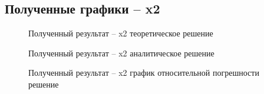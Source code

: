 \documentclass[12pt]{article}
\begin{document}
		\subsection{Полученные графики -- x2}
		
\begin{figure}[h]
	\caption{Полученный результат -- x2 теоретическое решение}
\end{figure}

\begin{figure}[h]
	\caption{Полученный результат -- x2 аналитическое решение}
\end{figure}

\begin{figure}[h]
	\caption{Полученный результат -- x2 график относительной погрешности решение}
\end{figure}
	\clearpage
\end{document}
